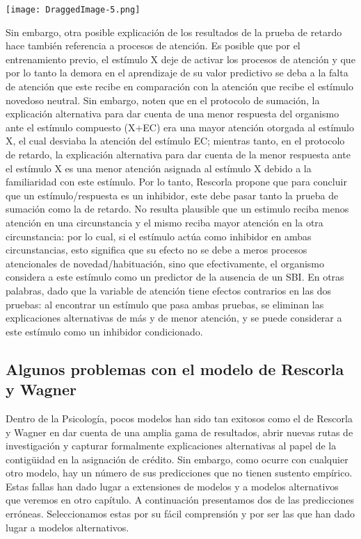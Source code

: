 \documentclass[
  a4paper,
  DIV=11,
  numbers=noendperiod]{scrreprt}
\begin{document}
\texttt{[image: DraggedImage-5.png]}

Sin embargo, otra posible explicación de los resultados de la prueba de
retardo hace también referencia a procesos de atención. Es posible que
por el entrenamiento previo, el estímulo X deje de activar los procesos
de atención y que por lo tanto la demora en el aprendizaje de su valor
predictivo se deba a la falta de atención que este recibe en comparación
con la atención que recibe el estímulo novedoso neutral. Sin embargo,
noten que en el protocolo de sumación, la explicación alternativa para
dar cuenta de una menor respuesta del organismo ante el estímulo
compuesto (X+EC) era una mayor atención otorgada al estímulo X, el cual
desviaba la atención del estímulo EC; mientras tanto, en el protocolo de
retardo, la explicación alternativa para dar cuenta de la menor
respuesta ante el estímulo X es una menor atención asignada al estímulo
X debido a la familiaridad con este estímulo. Por lo tanto, Rescorla
propone que para concluir que un estímulo/respuesta es un inhibidor,
este debe pasar tanto la prueba de sumación como la de retardo. No
resulta plausible que un estimulo reciba menos atención en una
circunstancia y el mismo reciba mayor atención en la otra circunstancia:
por lo cual, si el estímulo actúa como inhibidor en ambas
circunstancias, esto significa que su efecto no se debe a meros procesos
atencionales de novedad/habituación, sino que efectivamente, el
organismo considera a este estímulo como un predictor de la ausencia de
un SBI. En otras palabras, dado que la variable de atención tiene
efectos contrarios en las dos pruebas: al encontrar un estímulo que pasa
ambas pruebas, se eliminan las explicaciones alternativas de más y de
menor atención, y se puede considerar a este estímulo como un inhibidor
condicionado.

\subsection{Algunos problemas con el modelo de Rescorla y
Wagner}\label{algunos-problemas-con-el-modelo-de-rescorla-y-wagner}

Dentro de la Psicología, pocos modelos han sido tan exitosos como el de
Rescorla y Wagner en dar cuenta de una amplia gama de resultados, abrir
nuevas rutas de investigación y capturar formalmente explicaciones
alternativas al papel de la contigüidad en la asignación de crédito. Sin
embargo, como ocurre con cualquier otro modelo, hay un número de sus
predicciones que no tienen sustento empírico. Estas fallas han dado
lugar a extensiones de modelos y a modelos alternativos que veremos en
otro capítulo. A continuación presentamos dos de las predicciones
erróneas. Seleccionamos estas por su fácil comprensión y por ser las que
han dado lugar a modelos alternativos.
\end{document}
